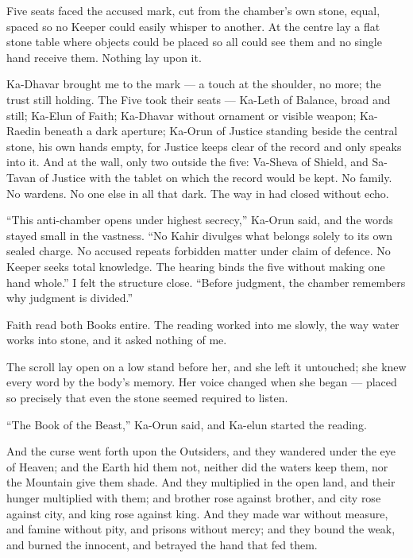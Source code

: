 Five seats faced the accused mark, cut from the chamber's own stone, equal, spaced so no Keeper could easily whisper to another. At the centre lay a flat stone table where objects could be placed so all could see them and no single hand receive them. Nothing lay upon it.\par
 
Ka-Dhavar brought me to the mark --- a touch at the shoulder, no more; the trust still holding. The Five took their seats --- Ka-Leth of Balance, broad and still; Ka-Elun of Faith; Ka-Dhavar without ornament or visible weapon; Ka-Raedin beneath a dark aperture; Ka-Orun of Justice standing beside the central stone, his own hands empty, for Justice keeps clear of the record and only speaks into it. And at the wall, only two outside the five: Va-Sheva of Shield, and Sa-Tavan of Justice with the tablet on which the record would be kept. No family. No wardens. No one else in all that dark. The way in had closed without echo.\par
 
``This anti-chamber opens under highest secrecy,'' Ka-Orun said, and the words stayed small in the vastness. ``No Kahir divulges what belongs solely to its own sealed charge. No accused repeats forbidden matter under claim of defence. No Keeper seeks total knowledge. The hearing binds the five without making one hand whole.'' I felt the structure close. ``Before judgment, the chamber remembers why judgment is divided.''\par
 
Faith read both Books entire. The reading worked into me slowly, the way water works into stone, and it asked nothing of me.\par
 
The scroll lay open on a low stand before her, and she left it untouched; she knew every word by the body's memory. Her voice changed when she began --- placed so precisely that even the stone seemed required to listen.\par
 
``The Book of the Beast,'' Ka-Orun said, and Ka-elun started the reading.\par
 
\begin{scripture}
And the curse went forth upon the Outsiders, and they wandered under the eye of Heaven; and the Earth hid them not, neither did the waters keep them, nor the Mountain give them shade.
And they multiplied in the open land, and their hunger multiplied with them; and brother rose against brother, and city rose against city, and king rose against king.
And they made war without measure, and famine without pity, and prisons without mercy; and they bound the weak, and burned the innocent, and betrayed the hand that fed them.
\end{scripture}
 
